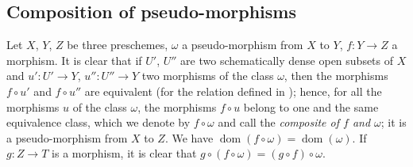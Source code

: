 \subsection{Composition of pseudo-morphisms}

\begin{env}[20.3.1]\label{IV.20.3.1}
Let $X$, $Y$, $Z$ be three preschemes, $\omega$ a pseudo-morphism from $X$ to $Y$, $f:Y\to Z$ a morphism.
It is clear that if $U'$, $U''$ are two schematically dense open subsets of $X$ and $u':U'\to Y$, $u'':U''\to Y$ two morphisms of the class $\omega$, then the morphisms $f\circ u'$ and $f\circ u''$ are equivalent (for the relation defined in ); hence, for all the morphisms $u$ of the class $\omega$, the morphisms $f\circ u$ belong to one and the same equivalence class, which we denote by $f\circ\omega$ and call the \emph{composite of $f$ and $\omega$}; it is a pseudo-morphism from $X$ to $Z$.
We have $\operatorname{dom}(f\circ\omega)=\operatorname{dom}(\omega)$.
If $g:Z\to T$ is a morphism, it is clear that $g\circ(f\circ\omega)=(g\circ f)\circ\omega$.
\end{env}

